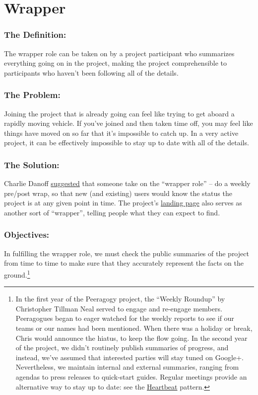 \section{Wrapper}
\subsubsection*{The Definition:} The wrapper role can be taken on by a project
participant who summarizes everything going on in the project, making
the project comprehensible to participants who haven't been following
all of the details.

\subsubsection*{The Problem:} Joining the project that is already going can feel
like trying to get aboard a rapidly moving vehicle. If you've joined and
then taken time off, you may feel like things have moved on so far that
it's impossible to catch up. In a very active project, it can be
effectively impossible to stay up to date with all of the details.

\subsubsection*{The Solution:} Charlie
Danoff \href{http://socialmediaclassroom.com/host/peeragogy/wiki/rolesdivision-labor}{suggested}
that someone take on the ``wrapper role'' -- do a weekly pre/post wrap,
so that new (and existing) users would know the status the project is at
any given point in time. The
project's \href{http://socialmediaclassroom.com/host/peeragogy/}{landing
page} also serves as another sort of ``wrapper'', telling people what
they can expect to find.

\subsubsection*{Objectives:} In fulfilling the wrapper role, we must check the
public summaries of the project from time to time to make sure that they
accurately represent the facts on the ground.\footnote{In the first year of the Peeragogy project, the
``Weekly Roundup'' by Christopher Tillman Neal served to engage and
re-engage members. Peeragogues began to eager watched for the weekly
reports to see if our teams or our names had been mentioned. When there
was a holiday or break, Chris would announce the hiatus, to keep the
flow going. In the second year of the project, we didn't routinely
publish summaries of progress, and instead, we've assumed that
interested parties will stay tuned on Google+. Nevertheless, we maintain
internal and external summaries, ranging from agendas to press releases
to quick-start guides. Regular meetings provide an alternative way to
stay up to date: see
the \href{http://peeragogy.org/patterns/heartbeat/}{Heartbeat} pattern.}

